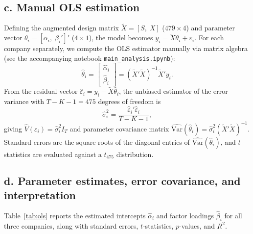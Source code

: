 \documentclass[11pt,a4paper]{article}
\begin{document}
\subsection*{c. Manual OLS estimation}
Defining the augmented design matrix $\tilde{X} = [S,\; X]$ ($479 \times 4$) and parameter vector $\theta_i = [\alpha_i,\; \beta_i']'$ ($4 \times 1$), the model becomes $y_i = \tilde{X}\theta_i + \varepsilon_i$. For each company separately, we compute the OLS estimator manually via matrix algebra (see the accompanying notebook \texttt{main\_analysis.ipynb}):
\begin{equation*}
    \hat{\theta}_i = \begin{bmatrix} \hat{\alpha}_i \\ \hat{\beta}_i \end{bmatrix} = (\tilde{X}'\tilde{X})^{-1}\tilde{X}'y_i.
\end{equation*}
From the residual vector $\hat{\varepsilon}_i = y_i - \tilde{X}\hat{\theta}_i$, the unbiased estimator of the error variance with $T - K - 1 = 475$ degrees of freedom is
\begin{equation*}
    \hat{\sigma}_i^2 = \frac{\hat{\varepsilon}_i'\hat{\varepsilon}_i}{T - K - 1},
\end{equation*}
giving $\hat{V}(\varepsilon_i) = \hat{\sigma}_i^2 I_T$ and parameter covariance matrix $\widehat{\mathrm{Var}}(\hat{\theta}_i) = \hat{\sigma}_i^2(\tilde{X}'\tilde{X})^{-1}$. Standard errors are the square roots of the diagonal entries of $\widehat{\mathrm{Var}}(\hat{\theta}_i)$, and $t$-statistics are evaluated against a $t_{475}$ distribution.

\subsection*{d. Parameter estimates, error covariance, and interpretation}
Table~\ref{tab:ols} reports the estimated intercepts $\hat{\alpha}_i$ and factor loadings $\hat{\beta}_i$ for all three companies, along with standard errors, $t$-statistics, $p$-values, and $R^2$.
\end{document}
